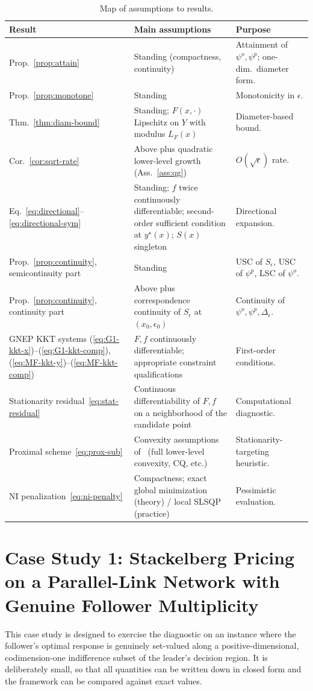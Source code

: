 \documentclass[11pt]{article}
\theoremstyle{definition}
\newcommand{\eps}{\epsilon}
\begin{document}
\begin{table}[ht]
\centering
\caption{Map of assumptions to results.}
\label{tab:assum-map}
\small
\begin{tabular}{@{}p{3.6cm}p{6.0cm}p{4.6cm}@{}}
\toprule
Result & Main assumptions & Purpose \\
\midrule
Prop.~\ref{prop:attain} & Standing (compactness, continuity) & Attainment of $\psi^o,\psi^p$; one-dim.\ diameter form. \\
Prop.~\ref{prop:monotone} & Standing & Monotonicity in $\eps$. \\
Thm.~\ref{thm:diam-bound} & Standing; $F(x,\cdot)$ Lipschitz on $Y$ with modulus $L_F(x)$ & Diameter-based bound. \\
Cor.~\ref{cor:sqrt-rate} & Above plus quadratic lower-level growth (Ass.~\ref{ass:qg}) & $O(\sqrt\eps)$ rate. \\
Eq.~\eqref{eq:directional}--\eqref{eq:directional-sym} & Standing; $f$ twice continuously differentiable; second-order sufficient condition at $y^\star(x)$; $S(x)$ singleton & Directional expansion. \\
Prop.~\ref{prop:continuity}, semicontinuity part & Standing & USC of $S_\eps$, USC of $\psi^p$, LSC of $\psi^o$. \\
Prop.~\ref{prop:continuity}, continuity part & Above plus correspondence continuity of $S_\eps$ at $(x_0,\eps_0)$ & Continuity of $\psi^o,\psi^p,\Delta_\eps$. \\
GNEP KKT systems (\ref{eq:G1-kkt-x})--(\ref{eq:G1-kkt-comp}), (\ref{eq:MF-kkt-y})--(\ref{eq:MF-kkt-comp}) & $F,f$ continuously differentiable; appropriate constraint qualifications & First-order conditions. \\
Stationarity residual~\eqref{eq:stat-residual} & Continuous differentiability of $F,f$ on a neighborhood of the candidate point & Computational diagnostic. \\
Proximal scheme~\eqref{eq:prox-sub} & Convexity assumptions of~\cite{lampariello2020numerically} (full lower-level convexity, CQ, etc.) & Stationarity-targeting heuristic. \\
NI penalization~\eqref{eq:ni-penalty} & Compactness; exact global minimization (theory) / local SLSQP (practice) & Pessimistic evaluation. \\
\bottomrule
\end{tabular}
\end{table}

\section{Case Study 1: Stackelberg Pricing on a Parallel-Link
Network with Genuine Follower Multiplicity}
\label{sec:case1}
This case study is designed to exercise the diagnostic on an
instance where the follower's optimal response is genuinely
set-valued along a positive-dimensional, codimension-one
indifference subset of the leader's decision region. It is
deliberately small, so that all quantities can be written down
in closed form and the framework can be compared against exact
values.
\end{document}
